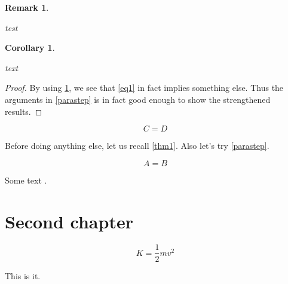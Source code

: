 \documentclass[amssymb,amsfonts]{amsart}
\makeatletter
\newtheorem{cor}[equation]{Corollary}
\newtheorem{rmk}[equation]{Remark}
\newenvironment{pfof}[1]%
	{\def\wwwnotes@pfofctr{#1}\begin{proof}}%
	{\end{proof}}
\makeatother
\begin{document}
\begin{rmk}\label{rmk1}
	\lipsum[27]

	test
\end{rmk}

\begin{cor}\label{cor1}
	\lipsum[24]

	text
\end{cor}

\begin{pfof}{cor1}
	By using \ref{rmk1}, we see that \ref{eq1} in fact implies something else. Thus the arguments in \ref{parastep} is in fact good enough to show the strengthened results. 
\end{pfof}

\begin{equation}
	C = D
\end{equation}


Before doing anything else, let us recall \ref{thm1}. Also let's try \ref{parastep}.

\lipsum[2]

\begin{equation}
	A = B
\end{equation}

\lipsum[3-8]




\lipsum[5-9]

Some text \cite{Wong2009}.


\chapter{Second chapter}


\lipsum[10-23]

\begin{equation}
K = \frac12 mv^2
\end{equation}

This is it.




\end{document}
